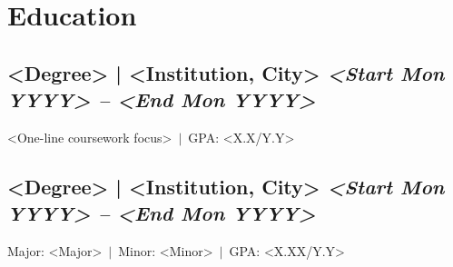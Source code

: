 \section*{Education}
\subsection{<Degree> | <Institution, City> \hfill
\textit{<Start Mon YYYY> -- <End Mon YYYY>}}
<One-line coursework focus>\ $|$\ GPA: <X.X/Y.Y>

\subsection{<Degree> | <Institution, City> \hfill
\textit{<Start Mon YYYY> -- <End Mon YYYY>}}
Major: <Major>\ $|$\ Minor: <Minor>\ $|$\ GPA: <X.XX/Y.Y>
